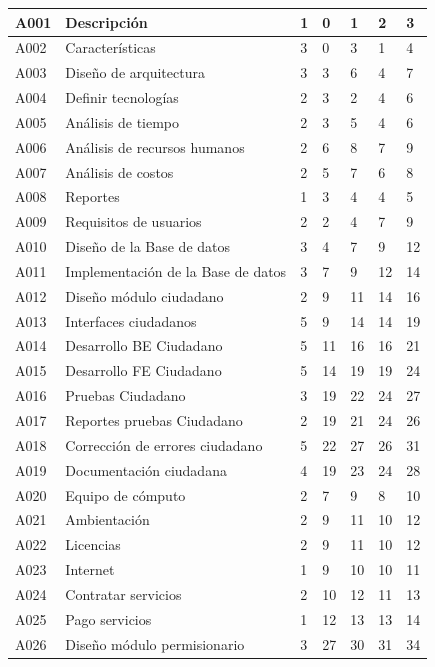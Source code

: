 \documentclass[12pt,twoside]{article}
\begin{document}
\begin{longtable}{|l|p{5cm}|l|l|l|l|l|}
    A001 & Descripción & 1 & 0 & 1 & 2 & 3 \\ \hline
    A002 & Características & 3 & 0 & 3 & 1 & 4 \\ \hline
    A003 & Diseño de arquitectura & 3 & 3 & 6 & 4 & 7 \\ \hline
    A004 & Definir tecnologías & 2 & 3 & 2 & 4 & 6 \\ \hline
    A005 & Análisis de tiempo & 2 & 3 & 5 & 4 & 6 \\ \hline
    A006 & Análisis de recursos humanos & 2 & 6 & 8 & 7 & 9 \\ \hline
    A007 & Análisis de costos & 2 & 5 & 7 & 6 & 8 \\ \hline
    A008 & Reportes & 1 & 3 & 4 & 4 & 5 \\ \hline
    A009 & Requisitos de usuarios & 2 & 2 & 4 & 7 & 9 \\ \hline
    A010 & Diseño de la Base de datos & 3 & 4 & 7 & 9 & 12 \\ \hline
    A011 & Implementación de la Base de datos & 3 & 7 & 9 & 12 & 14 \\ \hline
    A012 & Diseño módulo ciudadano & 2 & 9 & 11 & 14 & 16 \\ \hline
    A013 & Interfaces ciudadanos & 5 & 9 & 14 & 14 & 19 \\ \hline
    A014 & Desarrollo BE Ciudadano & 5 & 11 & 16 & 16 & 21 \\ \hline
    A015 & Desarrollo FE Ciudadano & 5 & 14 & 19 & 19 & 24 \\ \hline
    A016 & Pruebas Ciudadano & 3 & 19 & 22 & 24 & 27 \\ \hline
    A017 & Reportes pruebas Ciudadano & 2 & 19 & 21 & 24 & 26 \\ \hline
    A018 & Corrección de errores ciudadano & 5 & 22 & 27 & 26 & 31 \\ \hline
    A019 & Documentación ciudadana & 4 & 19 & 23 & 24 & 28 \\ \hline
    A020 & Equipo de cómputo & 2 & 7 & 9 & 8 & 10 \\ \hline
    A021 & Ambientación & 2 & 9 & 11 & 10 & 12 \\ \hline
    A022 & Licencias & 2 & 9 & 11 & 10 & 12 \\ \hline
    A023 & Internet & 1 & 9 & 10 & 10 & 11 \\ \hline
    A024 & Contratar servicios & 2 & 10 & 12 & 11 & 13 \\ \hline
    A025 & Pago servicios & 1 & 12 & 13 & 13 & 14 \\ \hline
    A026 & Diseño módulo permisionario & 3 & 27 & 30 & 31 & 34 \\ \hline

\end{longtable}
\end{document}
